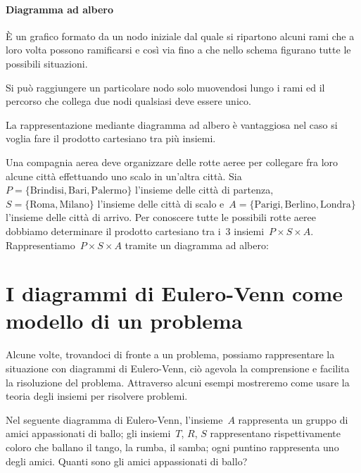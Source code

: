 {\begin{minipage}{.39 \textwidth}
\paragraph{Diagramma ad albero}
È un grafico formato da un nodo iniziale dal quale si ripartono alcuni
rami che a loro volta possono ramificarsi e così via fino a che nello
schema figurano tutte le possibili situazioni.

Si può raggiungere un particolare nodo solo muovendosi lungo i rami ed
il percorso che collega due nodi qualsiasi deve essere unico.

La rappresentazione mediante diagramma ad albero è vantaggiosa nel
caso si voglia fare il prodotto cartesiano tra più insiemi.
\end{minipage}

\begin{exrig}
 \begin{esempio}
 Una compagnia aerea deve organizzare delle rotte aeree per collegare fra 
 loro alcune città effettuando uno scalo in un'altra città. 
 Sia~$P=\{\text{Brindisi},\text{Bari},\text{Palermo}\}$ l'insieme delle città 
 di partenza, $S=\{\text{Roma},\text{Milano}\}$ l'insieme delle città di
 scalo e~$A=\{\text{Parigi},\text{Berlino},\text{Londra}\}$ l'insieme delle 
 città di arrivo. Per conoscere tutte le possibili rotte aeree dobbiamo
determinare il prodotto cartesiano tra i~3 insiemi~$P\times S\times A$.
Rappresentiamo~$P\times S\times A$ tramite un diagramma ad albero:

\begin{center}

\end{center}
 \end{esempio}
\end{exrig}

\section{I diagrammi di Eulero-Venn come modello di un problema}
\label{sec:insiemi_problemi}

Alcune volte, trovandoci di fronte a un problema, possiamo rappresentare
la situazione con diagrammi di Eulero-Venn, ciò agevola la
comprensione e facilita la risoluzione del problema. Attraverso alcuni
esempi mostreremo come usare la teoria degli insiemi per risolvere
problemi.

 \begin{esempio}
Nel seguente diagramma di Eulero-Venn, l'insieme~$A$ rappresenta un gruppo di 
amici appassionati di ballo; gli insiemi~$T$, $R$,
$S$ rappresentano rispettivamente coloro che ballano il tango, la rumba, il 
samba; ogni puntino rappresenta uno degli amici.
Quanti sono gli amici appassionati di ballo?


\end{esempio}}
